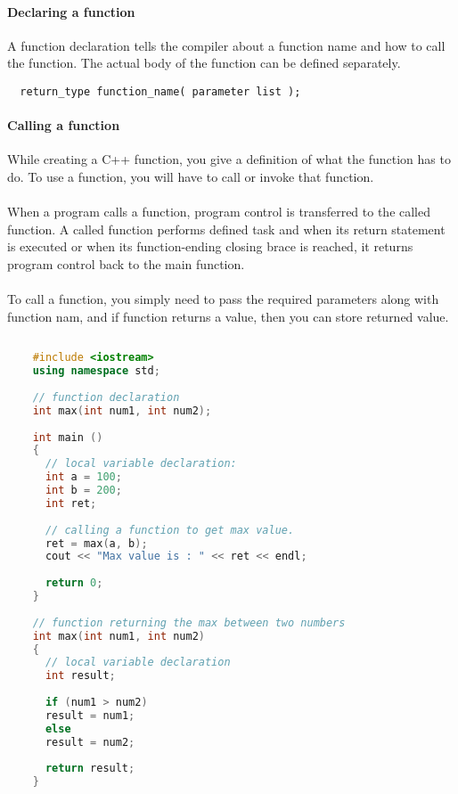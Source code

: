 \documentclass[11pt,fleqn]{book} %
\begin{document}
\paragraph{Declaring a function}
A function declaration tells the compiler about a function name and how to call the function. The actual body of the function can be defined separately.\\
\begin{lstlisting}
  return_type function_name( parameter list );
\end{lstlisting}
\newpage
\paragraph{Calling a function}
While creating a C++ function, you give a definition of what the function has to do. To use a function, you will have to call or invoke that function. \\ ~\\
When a program calls a function, program control is transferred to the called function. A called function performs defined task and when its return statement is executed or when its function-ending closing brace is reached, it returns program control back to the main function. \\ ~\\
To call a function, you simply need to pass the required parameters along with function nam, and if function returns a value, then you can store returned value.\\

\begin{example}
  \begin{lstlisting}[language=C++, caption = Declaration Definition and Calling of a max function]
    
    #include <iostream>
    using namespace std;
    
    // function declaration
    int max(int num1, int num2);
    
    int main () 
    {
      // local variable declaration:
      int a = 100;
      int b = 200;
      int ret;
      
      // calling a function to get max value.
      ret = max(a, b);
      cout << "Max value is : " << ret << endl;
      
      return 0;
    }
    
    // function returning the max between two numbers
    int max(int num1, int num2) 
    {
      // local variable declaration
      int result;
      
      if (num1 > num2)
      result = num1;
      else
      result = num2;
      
      return result; 
    }
  \end{lstlisting}
\end{example}
\end{document}
